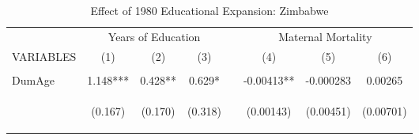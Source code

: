\begin{subtables}
\begin{landscape}														
\begin{table}[htpb!]														
\begin{center}														
\caption{Effect of 1980 Educational Expansion: Zimbabwe}														
\label{MMRtab:Zimbabwe}														
\begin{tabular}{lcccp{0.3cm}ccc}	\toprule													
& 	\multicolumn{3}{c}{Years of Education}					& &\multicolumn{3}{c}{Maternal Mortality }	\\	
VARIABLES & 		(1)	&	(2)	&	(3)	&&	(4)	&	(5)	&	(6)	\\ \cline{1-4} \cline{6-8}	
\vspace{4pt}	&	\begin{footnotesize}\end{footnotesize}	&	\begin{footnotesize}\end{footnotesize}	&	\begin{footnotesize}\end{footnotesize}	& \begin{footnotesize}\end{footnotesize} &	\begin{footnotesize}\end{footnotesize}	&	\begin{footnotesize}\end{footnotesize}	&		\begin{footnotesize}\end{footnotesize}	 \\
DumAge  	&	1.148***	&	0.428**	&	0.629*	&&	-0.00413**	&	-0.000283	&	0.00265	 \\	
	& \begin{footnotesize}	(0.167)	\end{footnotesize} & \begin{footnotesize}	(0.170)	\end{footnotesize} & \begin{footnotesize}	(0.318)	\end{footnotesize} & \begin{footnotesize}\end{footnotesize} & \begin{footnotesize}	(0.00143)	\end{footnotesize} & \begin{footnotesize}	(0.00451)	\end{footnotesize} & \begin{footnotesize}	(0.00701)	\end{footnotesize} \\	

\end{tabular}
\end{center}
\end{table}
\end{landscape}
\end{subtables}
